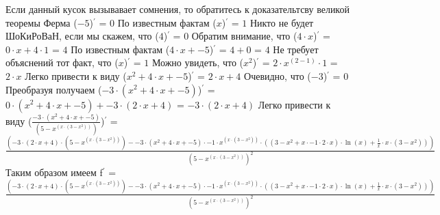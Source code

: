 \documentclass{article}
\begin{document}
\newline
Если данный кусок вызывавает сомнения, то обратитесь к доказательтсву великой теоремы Ферма \newline
($ -5 $)$ ^\prime $ = $ 0 $\newline
\newline
По известным фактам \newline
($ x $)$ ^\prime $ = $ 1 $\newline
\newline
Никто не будет ШоКиРоВаН, если мы скажем, что \newline
($ 4 $)$ ^\prime $ = $ 0 $\newline
\newline
Обратим внимание, что \newline
($ 4 \cdot x $)$ ^\prime $ = $ 0 \cdot x + 4 \cdot 1 $ = $ 4 $\newline
\newline
По известным фактам \newline
($ 4 \cdot x + -5 $)$ ^\prime $ = $ 4 + 0 $ = $ 4 $\newline
\newline
Не требует объяснений тот факт, что \newline
($ x $)$ ^\prime $ = $ 1 $\newline
\newline
Можно увидеть, что \newline
($ {x}^{2} $)$ ^\prime $ = $ 2 \cdot {x}^{(2 - 1)} \cdot 1 $ = $ 2 \cdot x $\newline
\newline
Легко привести к виду \newline
($ {x}^{2} + 4 \cdot x + -5 $)$ ^\prime $ = $ 2 \cdot x + 4 $\newline
\newline
Очевидно, что \newline
($ -3 $)$ ^\prime $ = $ 0 $\newline
\newline
Преобразуя получаем \newline
($ -3 \cdot ({x}^{2} + 4 \cdot x + -5) $)$ ^\prime $ = $ 0 \cdot ({x}^{2} + 4 \cdot x + -5) + -3 \cdot (2 \cdot x + 4) $ = $ -3 \cdot (2 \cdot x + 4) $\newline
\newline
Легко привести к виду \newline
($ \frac{-3 \cdot ({x}^{2} + 4 \cdot x + -5)}{(5 - {x}^{(x \cdot (3 - {x}^{2}))})} $)$ ^\prime $ = $ \frac{(-3 \cdot (2 \cdot x + 4) \cdot (5 - {x}^{(x \cdot (3 - {x}^{2}))}) - -3 \cdot ({x}^{2} + 4 \cdot x + -5) \cdot -1 \cdot {x}^{(x \cdot (3 - {x}^{2}))} \cdot ((3 - {x}^{2} + x \cdot -1 \cdot 2 \cdot x) \cdot \ln{(x)} + \frac{1}{x} \cdot x \cdot (3 - {x}^{2})))}{{(5 - {x}^{(x \cdot (3 - {x}^{2}))})}^{2}} $\newline
\newline
Таким образом имеем f$^\prime$ = $ \frac{(-3 \cdot (2 \cdot x + 4) \cdot (5 - {x}^{(x \cdot (3 - {x}^{2}))}) - -3 \cdot ({x}^{2} + 4 \cdot x + -5) \cdot -1 \cdot {x}^{(x \cdot (3 - {x}^{2}))} \cdot ((3 - {x}^{2} + x \cdot -1 \cdot 2 \cdot x) \cdot \ln{(x)} + \frac{1}{x} \cdot x \cdot (3 - {x}^{2})))}{{(5 - {x}^{(x \cdot (3 - {x}^{2}))})}^{2}} $\newline
\end{document}
